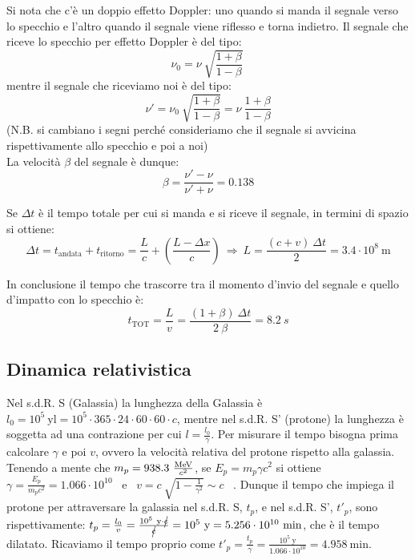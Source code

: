 \documentclass[12pt,twoside,a4]{article}
\begin{document}
\begin{solution}
	Si nota che c'è un doppio effetto Doppler: uno quando si manda il segnale verso lo specchio e l'altro quando il segnale viene riflesso e torna indietro.
 Il segnale che riceve lo specchio per effetto Doppler è del tipo: 
 \begin{equation*}
     \nu_0 =\nu \ \sqrt{\frac{1+\beta}{1-\beta}}\   
 \end{equation*}
 mentre il segnale che riceviamo noi è del tipo: 
 \begin{equation*}
     \nu' = \nu_0 \ \sqrt{\frac{1+\beta}{1-\beta}} = \nu \ \frac{1+\beta}{1-\beta} 
 \end{equation*}
 (N.B. si cambiano i segni perché consideriamo che il segnale si avvicina rispettivamente allo specchio e poi a noi) \\
 La velocità $\beta$ del segnale è dunque: 
 \begin{equation*}
 \beta = \frac{\nu' - \nu}{\nu' + \nu} = 0.138 
 \end{equation*}
 
 Se $\Delta t$ è il tempo totale per cui si manda e si riceve il segnale, in termini di spazio si ottiene: 
 \begin{equation*}
     \Delta t = t_{\mathrm{andata}} + t_{\mathrm{ritorno}} = \frac{L}{c} + \left(\frac{L-\Delta x}{c}\right)  \  \Rightarrow  \  L = \frac{(c+v) \ \Delta t}{2} = 3.4 \cdot 10^8 \ \mathrm{m} 
 \end{equation*}
 
 In conclusione il tempo che trascorre tra il momento d'invio del segnale e quello d'impatto con lo specchio è: 
 \begin{equation*}
     t_{\mathrm{TOT}} = \frac{L}{v} = \frac{(1+\beta) \ \Delta t}{2 \ \beta} = 8.2 \ s 
 \end{equation*}
\end{solution}


\newpage
\subsection{Dinamica relativistica}
\begin{solution}
	 Nel s.d.R. S (Galassia) la lunghezza della Galassia è $l_0 = 10^5 \ \mathrm{yl} = 10^5 \cdot 365 \cdot 24 \cdot 60 \cdot 60 \cdot c$, mentre nel s.d.R. S' (protone) la lunghezza è soggetta ad una contrazione per cui $l = \frac{l_0}{\gamma}$. 
 Per misurare il tempo bisogna prima calcolare $\gamma$ e poi $v$, ovvero la velocità relativa del protone rispetto alla galassia. 
 Tenendo a mente che $m_p = 938.3 \ \frac{\mev}{c^2}$, se $E_p = m_p \gamma c^2$ si ottiene $\gamma = \frac{E_p}{m_p c^2} = 1.066 \cdot 10^{10}$ \ e \ $v = c \ \sqrt{1-\frac{1}{\gamma^2}} \sim c$ \ .
 Dunque il tempo che impiega il protone per attraversare la galassia nel s.d.R. S, $t_p$, e nel s.d.R. S', $t'_p$, sono rispettivamente: $t_p = \frac{l_0}{v} = \frac{10^5 \ \mathrm{y} \cdot \cancel{c}}{\cancel{c}} = 10^5 \ \mathrm{y} = 5.256 \cdot 10^{10} \ \mathrm{min}$, che è il tempo dilatato. Ricaviamo il tempo proprio come $t'_p = \frac{t_p}{\gamma} = \frac{10^5 \ \mathrm{y}}{1.066 \cdot 10^{10}} = 4.958 \ \mathrm{min}$.
\end{solution}
\end{document}
